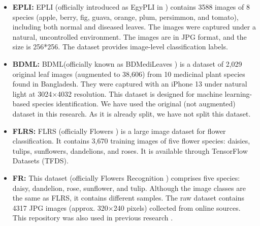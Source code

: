 \documentclass[a4paper,fleqn]{cas-dc}
\begin{document}
\begin{itemize}
\item \textbf{EPLI:} EPLI (officially introduced as EgyPLI in \cite{r10})  contains 3588 images of 8 species (apple, berry, fig, guava, orange, plum, persimmon, and tomato), including both normal and diseased leaves. The images were captured under a natural, uncontrolled environment. The images are in JPG format, and the size is 256*256. The dataset provides image‑level classification labels.

\item \textbf{BDML:} BDML(officially known as BDMediLeaves \cite{r11}) is a dataset of 2,029 original leaf images (augmented to 38,606) from 10 medicinal plant species found in Bangladesh. They were captured with an iPhone 13 under natural light at 3024×4032 resolution. This dataset is designed for machine learning-based species identification. We have used the original (not augmented) dataset in this research. As it is already split, we have not split this dataset.

\item \textbf{FLRS:} FLRS (officially Flowers \cite{r12}) is a large image dataset for flower classification. It contains 3,670 training images of five flower species: daisies, tulips, sunflowers, dandelions, and roses. It is available through TensorFlow Datasets (TFDS).

\item \textbf{FR:} This dataset (officially Flowers Recognition \cite{r13}) comprises five species: daisy, dandelion, rose, sunflower, and tulip. Although the image classes are the same as FLRS, it contains different samples. The raw dataset contains 4317 JPG images (approx. 320×240 pixels) collected from online sources. This repository was also used in previous research \cite{r100}\cite{r101}.
\end{itemize}
\end{document}
